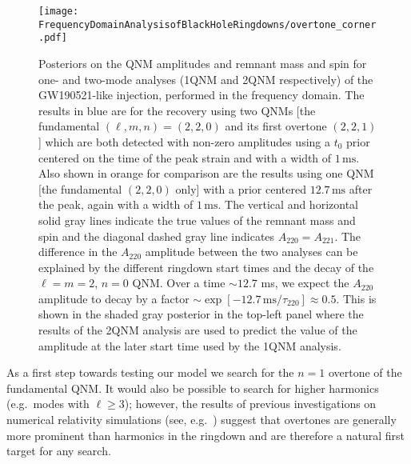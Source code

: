 \begin{figure}
	\centering
	\texttt{[image: FrequencyDomainAnalysisofBlackHoleRingdowns/overtone\_corner.pdf]}
	\caption[Posteriors on the QNM amplitudes and remnant mass and spin for one- and two-mode analyses of a GW190521-like injection]{ 
		Posteriors on the QNM amplitudes and remnant mass and spin for one- and two-mode analyses (1QNM and 2QNM respectively) of the GW190521-like injection, performed in the frequency domain.
		The results in blue are for the recovery using two QNMs [the fundamental $(\ell,m,n)=(2,2,0)$ and its first overtone $(2,2,1)$] which are both detected with non-zero amplitudes using a $t_0$ prior centered on the time of the peak strain and with a width of $1\,\mathrm{ms}$.
		Also shown in orange for comparison are the results using one QNM [the fundamental $(2,2,0)$ only] with a prior centered $12.7\,\mathrm{ms}$ after the peak, again with a width of $1\,\mathrm{ms}$.
		The vertical and horizontal solid gray lines indicate the true values of the remnant mass and spin and the diagonal dashed gray line indicates $A_{220}=A_{221}$.
		The difference in the $A_{220}$ amplitude between the two analyses can be explained by the different ringdown start times and the decay of the $\ell = m = 2$, $n = 0$ QNM.
		Over a time $\sim 12.7$ ms, we expect the $A_{220}$ amplitude to decay by a factor $\sim \exp[-12.7\,\mathrm{ms}/\tau_{220}] \approx 0.5$.
		This is shown in the shaded gray posterior in the top-left panel where the results of the 2QNM analysis are used to predict the value of the amplitude at the later start time used by the 1QNM analysis.
	}
	\label{fig:overtone_corner}
\end{figure}

As a first step towards testing our model we search for the $n=1$ overtone of the fundamental QNM.
It would also be possible to search for higher harmonics (e.g.\ modes with $\ell\geq 3$); however, the results of previous investigations on numerical relativity simulations (see, e.g.\ \cite{Giesler:2019uxc, Ota:2019bzl, Dhani:2020nik, Finch:2021iip}) suggest that overtones are generally more prominent than harmonics in the ringdown and are therefore a natural first target for any search.

